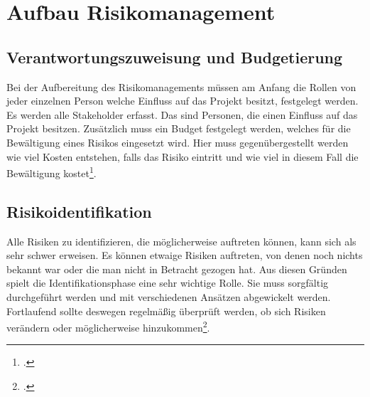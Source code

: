 \section{Aufbau Risikomanagement}
\subsection{Verantwortungszuweisung und Budgetierung}
Bei der Aufbereitung des Risikomanagements müssen am Anfang die Rollen von jeder einzelnen Person welche Einfluss auf das Projekt besitzt, festgelegt werden. Es werden alle Stakeholder erfasst. Das sind Personen, die einen Einfluss auf das Projekt besitzen.
Zusätzlich muss ein Budget festgelegt werden, welches für die Bewältigung eines Risikos eingesetzt wird. Hier muss gegenübergestellt werden wie viel Kosten entstehen, falls das Risiko eintritt und wie viel in diesem Fall die Bewältigung kostet\footcite{bva-risikomanagement}.

\subsection{Risikoidentifikation}
Alle Risiken zu identifizieren, die möglicherweise auftreten können, kann sich als sehr schwer erweisen. Es können etwaige Risiken auftreten, von denen noch nichts bekannt war oder die man nicht in Betracht gezogen hat. Aus diesen Gründen spielt die Identifikationsphase eine sehr wichtige Rolle. Sie muss sorgfältig durchgeführt werden und mit verschiedenen Ansätzen abgewickelt werden. Fortlaufend sollte deswegen regelmäßig überprüft werden, ob sich Risiken verändern oder möglicherweise hinzukommen\footcite{risikoidentifikation-definition}.

